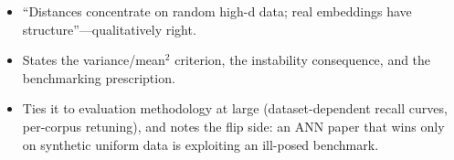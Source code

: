 \begin{interviewq}

\goodgreat
\begin{itemize}
    \item {} ``Distances concentrate on random high-d data; real embeddings have structure''---qualitatively right.
    \item {} States the variance/mean$^2$ criterion, the instability consequence, and the benchmarking prescription.
    \item {} Ties it to evaluation methodology at large (dataset-dependent recall curves, per-corpus retuning), and notes the flip side: an ANN paper that wins only on synthetic uniform data is exploiting an ill-posed benchmark.
\end{itemize}

\end{interviewq}
